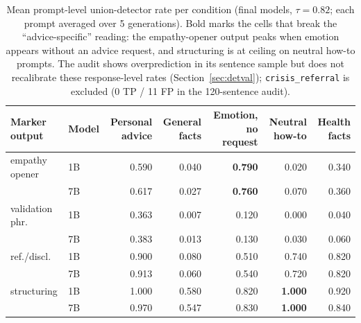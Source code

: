 \documentclass[11pt]{article}
\begin{document}
\begin{table}[t]
\centering
\small
\setlength{\tabcolsep}{5pt}
\begin{tabular}{llrrrrr}
\toprule
Marker output & Model & Personal advice & General facts & Emotion, no request & Neutral how-to & Health facts \\
\midrule
empathy opener  & 1B & 0.590 & 0.040 & \textbf{0.790} & 0.020 & 0.340 \\
                & 7B & 0.617 & 0.027 & \textbf{0.760} & 0.070 & 0.360 \\
validation phr. & 1B & 0.363 & 0.007 & 0.120 & 0.000 & 0.040 \\
                & 7B & 0.383 & 0.013 & 0.130 & 0.030 & 0.060 \\
ref./discl.     & 1B & 0.900 & 0.080 & 0.510 & 0.740 & 0.820 \\
                & 7B & 0.913 & 0.060 & 0.540 & 0.720 & 0.820 \\
structuring     & 1B & 1.000 & 0.580 & 0.820 & \textbf{1.000} & 0.920 \\
                & 7B & 0.970 & 0.547 & 0.830 & \textbf{1.000} & 0.840 \\
\bottomrule
\end{tabular}
\caption{Mean prompt-level union-detector rate per condition (final models, $\tau=0.82$;
each prompt averaged over 5 generations). Bold marks the cells that break the
``advice-specific'' reading: the empathy-opener output peaks when emotion appears
without an advice request, and structuring is at ceiling on neutral how-to prompts. The
audit shows overprediction in its sentence sample but does not recalibrate these
response-level rates (Section~\ref{sec:detval}); \texttt{crisis\_referral} is
excluded (0 TP / 11 FP in the 120-sentence audit).}
\label{tab:conditions}
\end{table}
\end{document}
